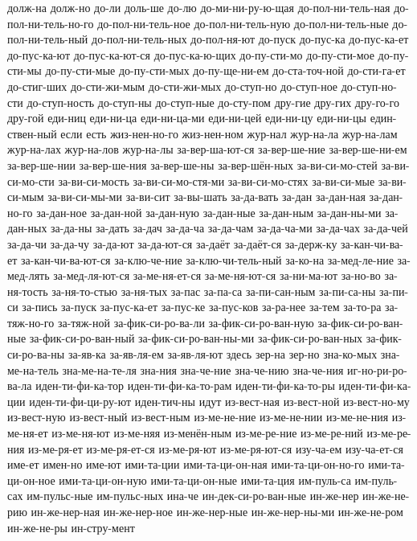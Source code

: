 {долж-на
долж-но
до-ли
доль-ше
до-лю
до-ми-ни-ру-ю-щая
до-пол-ни-тель-ная
до-пол-ни-тель-но-го
до-пол-ни-тель-ное
до-пол-ни-тель-ную
до-пол-ни-тель-ные
до-пол-ни-тель-ный
до-пол-ни-тель-ных
до-пол-ня-ют
до-пуск
до-пус-ка
до-пус-ка-ет
до-пус-ка-ют
до-пус-ка-ют-ся
до-пус-ка-ю-щих
до-пу-сти-мо
до-пу-сти-мое
до-пу-сти-мы
до-пу-сти-мые
до-пу-сти-мых
до-пу-ще-ни-ем
до-ста-точ-ной
до-сти-га-ет
до-стиг-ших
до-сти-жи-мым
до-сти-жи-мых
до-ступ-но
до-ступ-ное
до-ступ-но-сти
до-ступ-ность
до-ступ-ны
до-ступ-ные
до-сту-пом
дру-гие
дру-гих
дру-го-го
дру-гой
еди-ниц
еди-ни-ца
еди-ни-ца-ми
еди-ни-цей
еди-ни-цу
еди-ни-цы
един-ствен-ный
если
есть
жиз-нен-но-го
жиз-нен-ном
жур-нал
жур-на-ла
жур-на-лам
жур-на-лах
жур-на-лов
жур-на-лы
за-вер-ша-ют-ся
за-вер-ше-ние
за-вер-ше-ни-ем
за-вер-ше-нии
за-вер-ше-ния
за-вер-ше-ны
за-вер-шён-ных
за-ви-си-мо-стей
за-ви-си-мо-сти
за-ви-си-мость
за-ви-си-мо-стя-ми
за-ви-си-мо-стях
за-ви-си-мые
за-ви-си-мым
за-ви-си-мы-ми
за-ви-сит
за-вы-шать
за-да-вать
за-дан
за-дан-ная
за-дан-но-го
за-дан-ное
за-дан-ной
за-дан-ную
за-дан-ные
за-дан-ным
за-дан-ны-ми
за-дан-ных
за-да-ны
за-дать
за-дач
за-да-ча
за-да-чам
за-да-ча-ми
за-да-чах
за-да-чей
за-да-чи
за-да-чу
за-да-ют
за-да-ют-ся
за-даёт
за-даёт-ся
за-держ-ку
за-кан-чи-ва-ет
за-кан-чи-ва-ют-ся
за-клю-че-ние
за-клю-чи-тель-ный
за-ко-на
за-мед-ле-ние
за-мед-лять
за-мед-ля-ют-ся
за-ме-ня-ет-ся
за-ме-ня-ют-ся
за-ни-ма-ют
за-но-во
за-ня-тость
за-ня-то-стью
за-ня-тых
за-пас
за-па-са
за-пи-сан-ным
за-пи-са-ны
за-пи-си
за-пись
за-пуск
за-пус-ка-ет
за-пус-ке
за-пус-ков
за-ра-нее
за-тем
за-то-ра
за-тяж-но-го
за-тяж-ной
за-фик-си-ро-ва-ли
за-фик-си-ро-ван-ную
за-фик-си-ро-ван-ные
за-фик-си-ро-ван-ный
за-фик-си-ро-ван-ны-ми
за-фик-си-ро-ван-ных
за-фик-си-ро-ва-ны
за-яв-ка
за-яв-ля-ем
за-яв-ля-ют
здесь
зер-на
зер-но
зна-ко-мых
зна-ме-на-тель
зна-ме-на-те-ля
зна-ния
зна-че-ние
зна-че-нию
зна-че-ния
иг-но-ри-ро-ва-ла
иден-ти-фи-ка-тор
иден-ти-фи-ка-то-рам
иден-ти-фи-ка-то-ры
иден-ти-фи-ка-ции
иден-ти-фи-ци-ру-ют
иден-тич-ны
идут
из-вест-ная
из-вест-ной
из-вест-но-му
из-вест-ную
из-вест-ный
из-вест-ным
из-ме-не-ние
из-ме-не-нии
из-ме-не-ния
из-ме-ня-ет
из-ме-ня-ют
из-ме-няя
из-менён-ным
из-ме-ре-ние
из-ме-ре-ний
из-ме-ре-ния
из-ме-ря-ет
из-ме-ря-ет-ся
из-ме-ря-ют
из-ме-ря-ют-ся
изу-ча-ем
изу-ча-ет-ся
име-ет
имен-но
име-ют
ими-та-ции
ими-та-ци-он-ная
ими-та-ци-он-но-го
ими-та-ци-он-ное
ими-та-ци-он-ную
ими-та-ци-он-ные
ими-та-ция
им-пуль-са
им-пуль-сах
им-пульс-ные
им-пульс-ных
ина-че
ин-дек-си-ро-ван-ные
ин-же-нер
ин-же-не-рию
ин-же-нер-ная
ин-же-нер-ное
ин-же-нер-ные
ин-же-нер-ны-ми
ин-же-не-ром
ин-же-не-ры
ин-стру-мент
}

